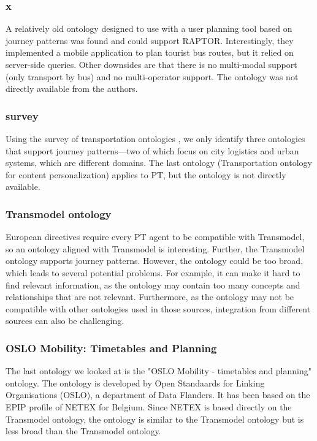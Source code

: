 \subsubsection{x}
A relatively old ontology designed to use with a user planning tool based on journey patterns \cite{5507372} was found and could support RAPTOR. Interestingly, they implemented a mobile application to plan tourist bus routes, but it relied on server-side queries. Other downsides are that there is no multi-modal support (only transport by bus) and no multi-operator support. The ontology was not directly available from the authors.

\subsubsection{survey}
Using the survey of transportation ontologies \cite{katsumi_ontologies_2018}, we only identify three ontologies that support journey patterns—two of which focus on city logistics and urban systems, which are different domains. The last ontology (Transportation ontology for content personalization) applies to PT, but the ontology is not directly available.

\subsubsection{Transmodel ontology}
European directives require every PT agent to be compatible with Transmodel, so an ontology aligned with Transmodel is interesting. Further, the Transmodel ontology supports journey patterns. However, the ontology could be too broad, which leads to several potential problems. For example, it can make it hard to find relevant information, as the ontology may contain too many concepts and relationships that are not relevant. Furthermore, as the ontology may not be compatible with other ontologies used in those sources, integration from different sources can also be challenging.

\subsubsection{OSLO Mobility: Timetables and Planning}
The last ontology we looked at is the "OSLO Mobility - timetables and planning" \cite{noauthor_oslo_2023} ontology. The ontology is developed by Open Standaards for Linking Organisations (OSLO), a department of Data Flanders. It has been based on the EPIP profile of NETEX for Belgium. Since NETEX is based directly on the Transmodel ontology, the ontology is similar to the Transmodel ontology but is less broad than the Transmodel ontology.

